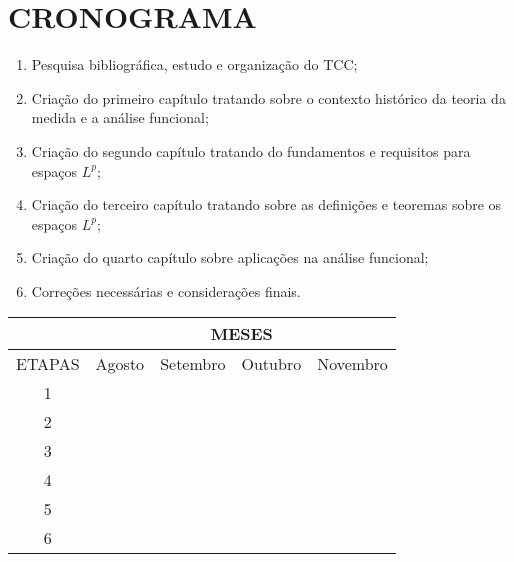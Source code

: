 \chapter{CRONOGRAMA}
\label{cap:cronograma}

\center

\begin{enumerate}
    \item Pesquisa bibliográfica, estudo e organização do TCC;
    \item Criação do primeiro capítulo tratando sobre o contexto histórico da teoria da medida e a análise funcional;
    \item Criação do segundo capítulo tratando do fundamentos e requisitos para espaços $L^p$;
    \item Criação do terceiro capítulo tratando sobre as definições e teoremas sobre os espaços $L^p$;
    \item Criação do quarto capítulo sobre aplicações na análise funcional; 
    \item Correções necessárias e considerações finais. 
\end{enumerate}
\centering
\begin{table}[h]
	\begin{tabular}{|l|l|l|l|l|}
	\hline
	\multicolumn{1}{|c|}{} &
	\multicolumn{4}{|c|}{MESES} \\
	\hline
	\multicolumn{1}{|c|}{ETAPAS} &
	\multicolumn{1}{c|}{Agosto} &
	\multicolumn{1}{c|}{Setembro} &
	\multicolumn{1}{c|}{Outubro} &
	\multicolumn{1}{c|}{Novembro} \\
	\hline
        \multicolumn{1}{|c|}{1} &
        \cellcolor[gray]{0.8}\color{black} &
        \multicolumn{1}{c|}{} &
        \multicolumn{1}{c|}{} &
        \multicolumn{1}{c|}{} \\
	\hline
        \multicolumn{1}{|c|}{2} &
        \multicolumn{1}{c|}{} &
        \cellcolor[gray]{0.8}\color{black} &
        \multicolumn{1}{c|}{} &
        \multicolumn{1}{c|}{} \\
	\hline
        \multicolumn{1}{|c|}{3} &
        \multicolumn{1}{c|}{} &
        \cellcolor[gray]{0.8}\color{black} &
        \multicolumn{1}{c|}{} &
        \multicolumn{1}{c|}{} \\
	\hline
        \multicolumn{1}{|c|}{4} &
        \multicolumn{1}{c|}{} &
        \multicolumn{1}{c|}{} &
        \cellcolor[gray]{0.8}\color{black} &
        \multicolumn{1}{c|}{} \\
	\hline
        \multicolumn{1}{|c|}{5} &
        \multicolumn{1}{c|}{} &
        \multicolumn{1}{c|}{} &
        \cellcolor[gray]{0.8}\color{black} &
        \multicolumn{1}{c|}{} \\
	\hline
        \multicolumn{1}{|c|}{6} &
        \multicolumn{1}{c|}{} &
        \multicolumn{1}{c|}{} &
        \multicolumn{1}{c|}{} &
        \cellcolor[gray]{0.8}\color{black} \\
	\hline
	\end{tabular}
\end{table}